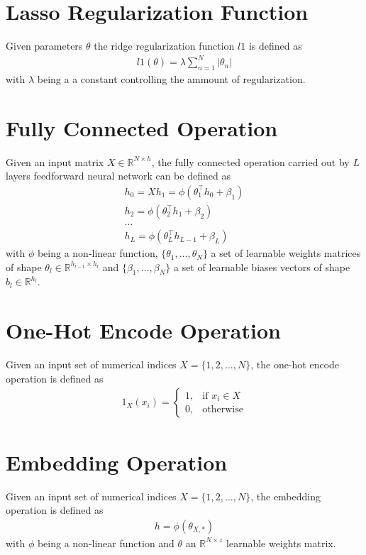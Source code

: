 \section{Lasso Regularization Function}
Given parameters $\theta$ the ridge regularization function $l1$ is defined as 
\begin{gather}
    \label{lasso}
    l1(\theta) = \lambda \sum_{n=1}^{N}|\theta_n|
\end{gather}
with $\lambda$ being a a constant controlling the ammount of regularization.

\section{Fully Connected Operation}
Given an input matrix $X \in \mathbb{R}^{N \times h}$, the fully connected operation carried out by $L$ layers feedforward neural network can be defined as
\begin{gather}
    \label{fnn_operation}
    h_0 = X
    h_1 = \phi(\theta_1^\top h_0 + \beta_1)\\ \nonumber
    h_2 = \phi(\theta_2^\top h_1  + \beta_2)\\ \nonumber
    \dots\\ \nonumber
    h_L = \phi(\theta_L^\top h_{L-1}  + \beta_L) \nonumber
\end{gather}
with $\phi$ being a non-linear function, $\{\theta_1, \dots, \theta_N\}$ a set of learnable weights matrices of shape $\theta_l \in \mathbb{R}^{h_{l-1} \times h_{l}}$ and $\{\beta_1, \dots, \beta_N\}$ a set of learnable biases vectors of shape $b_l \in \mathbb{R}^{h_l}$.

\section{One-Hot Encode Operation}
Given an input set of numerical indices $X = \{1, 2, \dots, N\}$, the one-hot encode operation is defined as 
\begin{gather}
    \label{one_hot_encode_operation}
    1_X(x_i) = 
    \begin{cases}
        1,& \text{if } x_i \in X \\
        0,              & \text{otherwise}
    \end{cases}
\end{gather}

\section{Embedding Operation}
Given an input set of numerical indices $X = \{1, 2, \dots, N\}$, the embedding operation is defined as 
\begin{gather}
    \label{embedding_operation}
    h = \phi(\theta_{X,*})
\end{gather}
with $\phi$ being a non-linear function and $\theta$ an $\mathbb{R}^{N \times z}$ learnable weights matrix.

